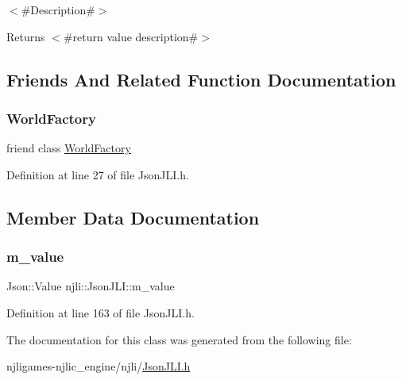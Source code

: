 $<$\#\+Description\#$>$

\begin{DoxyReturn}{Returns}
$<$\#return value description\#$>$ 
\end{DoxyReturn}


\subsection{Friends And Related Function Documentation}
\mbox{\label{classnjli_1_1_json_j_l_i_acb96ebb09abe8f2a37a915a842babfac}} 
\subsubsection{\texorpdfstring{World\+Factory}{WorldFactory}}
{\footnotesize\ttfamily friend class \mbox{\hyperlink{classnjli_1_1_world_factory}{World\+Factory}}\hspace{0.3cm}{\ttfamily [friend]}}



Definition at line 27 of file Json\+J\+L\+I.\+h.



\subsection{Member Data Documentation}
\mbox{\label{classnjli_1_1_json_j_l_i_a3e99d03b130213e9923417753929b4f6}} 
\subsubsection{\texorpdfstring{m\+\_\+value}{m\_value}}
{\footnotesize\ttfamily Json\+::\+Value njli\+::\+Json\+J\+L\+I\+::m\+\_\+value\hspace{0.3cm}{\ttfamily [private]}}



Definition at line 163 of file Json\+J\+L\+I.\+h.



The documentation for this class was generated from the following file\+:\begin{DoxyCompactItemize}
\item 
njligames-\/njlic\+\_\+engine/njli/\mbox{\hyperlink{_json_j_l_i_8h}{Json\+J\+L\+I.\+h}}\end{DoxyCompactItemize}

